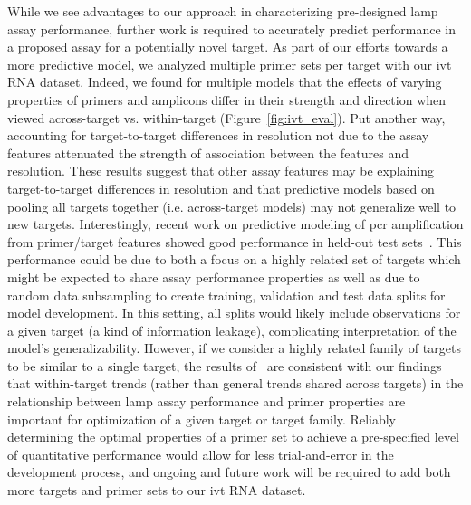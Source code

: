 \documentclass[../thesis.tex]{subfiles}
\begin{document}
While we see advantages to our approach in characterizing pre-designed \gls{lamp} assay performance, further work is required to accurately predict performance in a proposed assay for a potentially novel target. As part of our efforts towards a more predictive model, we analyzed multiple primer sets per target with our \gls{ivt} RNA dataset. Indeed, we found for multiple models that the effects of varying properties of primers and amplicons differ in their strength and direction when viewed across-target vs. within-target (Figure~\ref{fig:ivt_eval}). Put another way, accounting for target-to-target differences in resolution not due to the assay features attenuated the strength of association between the features and resolution. These results suggest that other assay features may be explaining target-to-target differences in resolution and that predictive models based on pooling all targets together (i.e. across-target models) may not generalize well to new targets. Interestingly, recent work on predictive modeling of \gls{pcr} amplification from primer/target features showed good performance in held-out test sets~\citep{doring_modeling_2019}. This performance could be due to both a focus on a highly related set of targets which might be expected to share assay performance properties as well as due to random data subsampling to create training, validation and test data splits for model development. In this setting, all splits would likely include observations for a given target (a kind of information leakage), complicating interpretation of the model's generalizability. However, if we consider a highly related family of targets to be similar to a single target, the results of~\citet{doring_modeling_2019} are consistent with our findings that within-target trends (rather than general trends shared across targets) in the relationship between \gls{lamp} assay performance and primer properties are important for optimization of a given target or target family. Reliably determining the optimal properties of a primer set to achieve a pre-specified level of quantitative performance would allow for less trial-and-error in the development process, and ongoing and future work will be required to add both more targets and primer sets to our \gls{ivt} RNA dataset.
\end{document}
